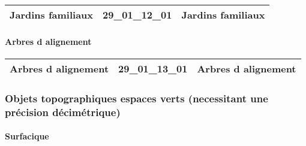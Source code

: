 \documentclass[12pt,titlepage,oneside]{book}
\begin{document}
\renewcommand{\arraystretch}{1.2}
\begin{supertabular}{|p{10cm}|c|p{15cm}|}
 Jardins familiaux & 29\_01\_12\_01 & Jardins familiaux\\
\hline
\end{supertabular}


\paragraph{Arbres d alignement}
\noindent
\vspace{\baselineskip}

\renewcommand{\arraystretch}{1.2}
\begin{supertabular}{|p{10cm}|c|p{15cm}|}
 Arbres d alignement & 29\_01\_13\_01 & Arbres d alignement\\
\hline
\end{supertabular}

\subsubsection{\large Objets topographiques espaces verts (necessitant une précision décimétrique)}
\paragraph{Surfacique}
\noindent
\vspace{\baselineskip}
\end{document}
